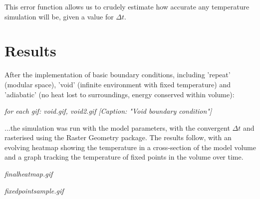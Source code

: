 \documentclass{article}
\begin{document}
This error function allows us to crudely estimate how accurate any temperature simulation will be, given a value for $\Delta t$.

\section{Results}

After the implementation of basic boundary conditions, including 'repeat' (modular space), 'void' (infinite environment with fixed temperature) and 'adiabatic' (no heat lost to surroundings, energy conserved within volume):

\emph{for each gif: void.gif, void2.gif [Caption: "Void boundary condition"]}


...the simulation was run with the model parameters, with the convergent $\Delta t$ and rasterised using the Raster Geometry package. The results follow, with an evolving heatmap showing the temperature in a cross-section of the model volume and a graph tracking the temperature of fixed points in the volume over time.

\emph{finalheatmap.gif}

\emph{fixedpointsample.gif}
\end{document}

